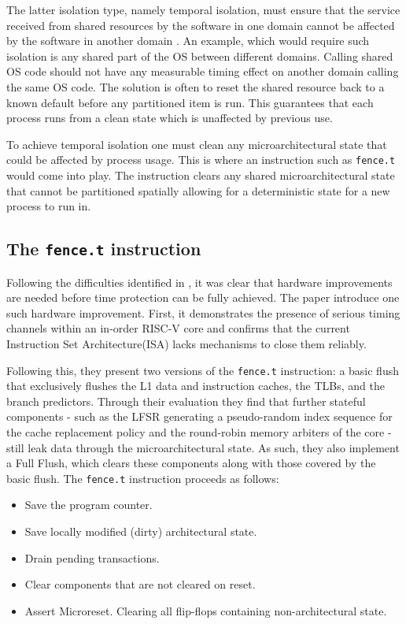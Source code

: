 The latter isolation type, namely temporal isolation, must ensure that the
service received from shared resources by the software in one domain cannot be
affected by the software in another domain \cite{rushby1999}. An example, which
would require such isolation is any shared part of the OS between different
domains. Calling shared OS code should not have any measurable timing effect
on another domain calling the same OS code. The solution is often to reset the
shared resource back to a known default before any partitioned item is run.
This guarantees that each process runs from a clean state which is unaffected
by previous use.

To achieve temporal isolation one must clean any microarchitectural state that
could be affected by process usage. This is where an instruction such as
\texttt{fence.t} \cite{wistoff2023} would come into play. The instruction
clears any shared microarchitectural state that cannot be partitioned spatially
allowing for a deterministic state for a new process to run in.

\subsection{The \texttt{fence.t} instruction}\label{sub:temporal} %
Following the difficulties identified in \cite{ge2019}, it was clear that
hardware improvements are needed before time protection can be fully achieved.
The paper \cite{wistoff2023} introduce one such hardware improvement. First, it
demonstrates the presence of serious timing channels within an in-order RISC-V
core and confirms that the current Instruction Set Architecture(ISA) lacks
mechanisms to close them reliably.

Following this, they present two versions of the \texttt{fence.t} instruction:
a basic flush that exclusively flushes the L1 data and instruction caches, the
TLBs, and the branch predictors. Through their evaluation they find that
further stateful components - such as the LFSR generating a pseudo-random index
sequence for the cache replacement policy and the round-robin memory arbiters
of the core - still leak data through the microarchitectural state. As such,
they also implement a Full Flush, which clears these components along with
those covered by the basic flush. The \texttt{fence.t} instruction proceeds as
follows:
\begin{itemize}
  \item Save the program counter.
  \item Save locally modified (dirty) architectural state.
  \item Drain pending transactions.
  \item Clear components that are not cleared on reset.
  \item Assert Microreset. Clearing all flip-flops containing non-architectural
    state.
\end{itemize}

